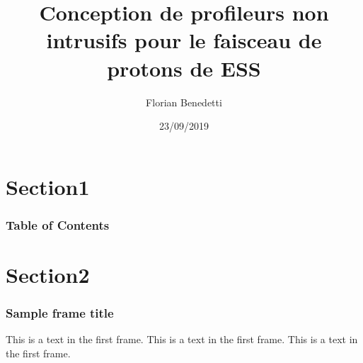 \documentclass{beamer}
\title{Conception de profileurs non intrusifs pour le faisceau de protons de ESS}
\author{Florian Benedetti}
\institute{CEA/IRFU}
\date{23/09/2019}
\begin{document}
\frame{\titlepage}

\section{Section1}
\begin{frame}
  \frametitle{Table of Contents}
  \tableofcontents
\end{frame}

\section{Section2}
\begin{frame}
  \frametitle{Sample frame title}
  This is a text in the first frame. This is a text in the first frame. This is a text in the first frame.
\end{frame}
\end{document}
